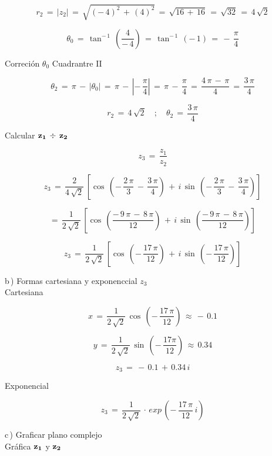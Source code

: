 \documentclass[a4paper,11pt,openany]{book}
\begin{document}
$$r_{2}\,=\,|z_{2}|\,=\,\sqrt{(-\,4)^{2}\,+\,(4)^{2}}\,=\,\sqrt{16\,+\,16}\,=\,\sqrt{32}\,=\,4\,\sqrt{2}$$

$$\theta_{0}\,=\,\tan^{-\,1}\,\left(\dfrac{4}{-\,4}\right)\,=\,\tan^{-\,1}\,(-\,1)\,=\,-\,\dfrac{\pi}{4}$$

\textcolor{ao(english)}{} Correción $\theta_{0}$ Cuadrantre II

$$\theta_{2}\,=\,\pi\,-\,|\theta_{0}|\,=\,\pi\,-\,\left|-\,\dfrac{\pi}{4}\right|\,=\,\pi\,-\,\dfrac{\pi}{4}\,=\,\dfrac{4\,\pi\,-\,\pi}{4}\,=\,\dfrac{3\,\pi}{4}$$

$$\boxed{r_{2}\,=\,4\,\sqrt{2} \quad;\quad \theta_{2}\,=\,\dfrac{3\,\pi}{4}}$$

\textcolor{ao(english)}{} Calcular $\bf{z_{1}\,\div\,z_{2}}$

$$z_{3}\,=\,\dfrac{z_{1}}{z_{2}}$$

$$z_{3}\,=\,\dfrac{2}{4\,\sqrt{2}}\,\left[\cos\,\left(-\,\dfrac{2\,\pi}{3}\,-\,\dfrac{3\,\pi}{4}\right)\,+\,i\,\sin\,\left(-\,\dfrac{2\,\pi}{3}\,-\,\dfrac{3\,\pi}{4}\right)\right]$$

$$=\,\dfrac{1}{2\,\sqrt{2}}\,\left[\cos\,\left(\dfrac{-\,9\,\pi\,-\,8\,\pi}{12}\right)\,+\,i\,\sin\,\left(\dfrac{-\,9\,\pi\,-\,8\,\pi}{12}\right)\right]$$

$$z_{3}\,=\,\dfrac{1}{2\,\sqrt{2}}\,\left[\cos\,\left(-\,\dfrac{17\,\pi}{12}\right)\,+\,i\,\sin\,\left(-\,\dfrac{17\,\pi}{12}\right)\right]$$

\textcolor{ao(english)}{b\,)} Formas cartesiana y exponenccial $z_{3}$\\

\textcolor{ao(english)}{} Cartesiana

$$x\,=\,\dfrac{1}{2\,\sqrt{2}}\,\cos\,\left(-\,\dfrac{17\,\pi}{12}\right)\,\approx\,-\,0.1$$

$$y\,=\,\dfrac{1}{2\,\sqrt{2}}\,\sin\,\left(-\,\dfrac{17\pi}{12}\right)\,\approx\,0.34$$

$$z_{3}\,=\,-\,0.1\,+\,0.34\,i$$

\textcolor{ao(english)}{} Exponencial

$$z_{3}\,=\,\dfrac{1}{2\,\sqrt{2}}\,\cdot\,exp\,\left(-\,\dfrac{17\,\pi}{12}\,i\right)$$

\textcolor{ao(english)}{c\,)} Graficar plano complejo\\

\textcolor{ao(english)}{} Gráfica $\bf{z_{1}}$ y $\bf{z_{2}}$
\end{document}
